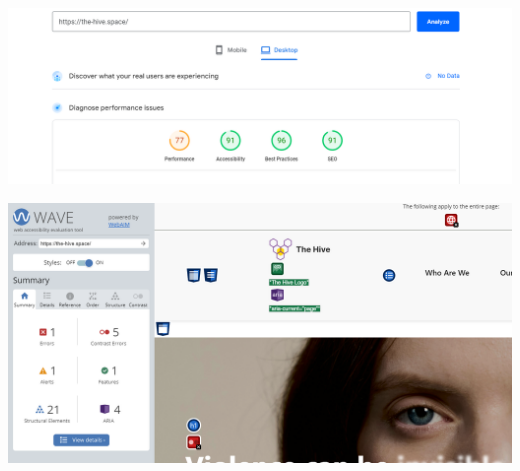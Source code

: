 \begin{center}
    \includegraphics[width=0.75\linewidth]{img/lighthouse-result.png} 
\end{center}

\vspace{1em}

\begin{center}
    \includegraphics[width=0.75\linewidth]{img/wave-result.png} 
\end{center}
